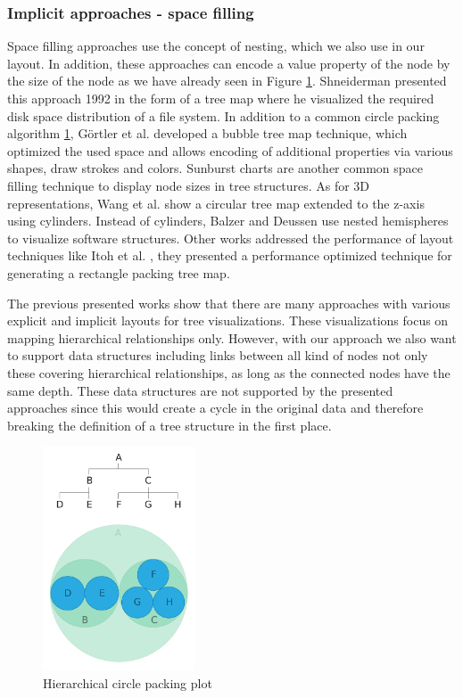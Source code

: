 \subsubsection{Implicit approaches - space filling}
Space filling approaches use the concept of nesting, which we also use in our layout. In addition, these approaches can encode a value property of the node by the size of the node as we have already seen in Figure \ref{fig:hierarchicalCirclePlot}.
Shneiderman \cite{shneiderman_tree_1992} presented this approach 1992 in the form of a tree map where he visualized the required disk space distribution of a file system. In addition to a common circle packing algorithm \ref{fig:hierarchicalCirclePlot}, Görtler et al. \cite{gortler_bubble_2018} developed a bubble tree map technique, which optimized the used space and allows encoding of additional properties via various shapes, draw strokes and colors. Sunburst charts are another common space filling technique to display node sizes in tree structures. 
As for 3D representations, Wang et al. \cite{wang_visualization_2006} show a circular tree map extended to the z-axis using cylinders. Instead of cylinders, Balzer and Deussen \cite{balzer_hierarchy_2004} use nested hemispheres to visualize software structures.
Other works addressed the performance of layout techniques like Itoh et al. \cite{itoh_hierarchical_2004}, they presented a performance optimized technique for generating a rectangle packing tree map.

The previous presented works show that there are many approaches with various explicit and implicit layouts for tree visualizations. These visualizations focus on mapping hierarchical relationships only. 
However, with our approach we also want to support data structures including links between all kind of nodes not only these covering hierarchical relationships, as long as the connected nodes have the same depth. These data structures are not supported by the presented approaches since this would create a cycle in the original data and therefore breaking the definition of a tree structure in the first place.

\begin{figure}[!hbt]
    \centering
    \includegraphics[width=0.40\textwidth, trim={0 0 0 4.3cm},clip]{graphics/circle_packing.pdf}
    \caption{Hierarchical circle packing plot \cite{ribecca_circle_nodate}}
    \label{fig:hierarchicalCirclePlot}
\end{figure}

